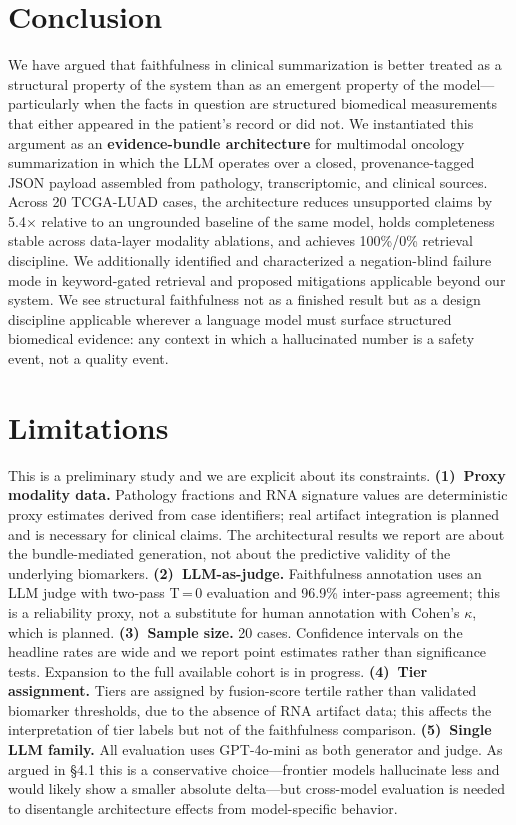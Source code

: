 \documentclass[11pt]{article}
\begin{document}
\section{Conclusion}

We have argued that faithfulness in clinical summarization is better treated as a structural property of the system than as an emergent property of the model—particularly when the facts in question are structured biomedical measurements that either appeared in the patient's record or did not. We instantiated this argument as an \textbf{evidence-bundle architecture} for multimodal oncology summarization in which the LLM operates over a closed, provenance-tagged JSON payload assembled from pathology, transcriptomic, and clinical sources. Across 20 TCGA-LUAD cases, the architecture reduces unsupported claims by 5.4$\times$ relative to an ungrounded baseline of the same model, holds completeness stable across data-layer modality ablations, and achieves 100\%/0\% retrieval discipline. We additionally identified and characterized a negation-blind failure mode in keyword-gated retrieval and proposed mitigations applicable beyond our system. We see structural faithfulness not as a finished result but as a design discipline applicable wherever a language model must surface structured biomedical evidence: any context in which a hallucinated number is a safety event, not a quality event.

\section*{Limitations}

This is a preliminary study and we are explicit about its constraints. \textbf{(1)~Proxy modality data.} Pathology fractions and RNA signature values are deterministic proxy estimates derived from case identifiers; real artifact integration is planned and is necessary for clinical claims. The architectural results we report are about the bundle-mediated generation, not about the predictive validity of the underlying biomarkers. \textbf{(2)~LLM-as-judge.} Faithfulness annotation uses an LLM judge with two-pass T\,=\,0 evaluation and 96.9\% inter-pass agreement; this is a reliability proxy, not a substitute for human annotation with Cohen's $\kappa$, which is planned. \textbf{(3)~Sample size.} 20 cases. Confidence intervals on the headline rates are wide and we report point estimates rather than significance tests. Expansion to the full available cohort is in progress. \textbf{(4)~Tier assignment.} Tiers are assigned by fusion-score tertile rather than validated biomarker thresholds, due to the absence of RNA artifact data; this affects the interpretation of tier labels but not of the faithfulness comparison. \textbf{(5)~Single LLM family.} All evaluation uses GPT-4o-mini as both generator and judge. As argued in \S4.1 this is a conservative choice—frontier models hallucinate less and would likely show a smaller absolute delta—but cross-model evaluation is needed to disentangle architecture effects from model-specific behavior.
\end{document}
